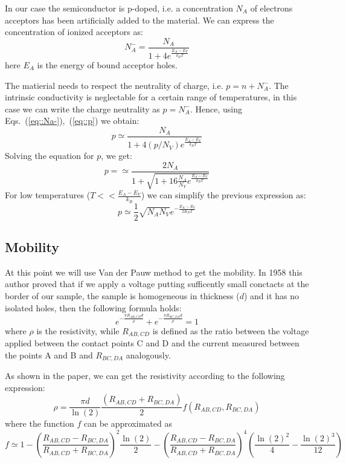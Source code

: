\documentclass[11pt,a4paper]{article}
\begin{document}
In our case the semiconductor is p-doped, i.e. a concentration $N_A$ of electrons acceptors has been artificially added to the material. We can express the concentration of ionized acceptors as:
\begin{equation}
N_A^-=\frac{N_A}{1+4e^{\frac{E_A-E_F}{k_BT}}}\label{eq::Na-}
\end{equation}
here $E_A$ is the energy of bound acceptor holes.

The matierial needs to respect the neutrality of charge, i.e. $p=n+N_A^-$. The intrinsic conductivity is neglectable for a certain range of temperatures, in this case we can write the charge neutrality as $p=N_A^-$. Hence, using Eqs.~(\ref{eq::Na-}),~(\ref{eq::p}) we obtain:
\begin{equation}
p\simeq\frac{N_A}{1+4(p/N_V)e^{\frac{E_A-E_V}{k_BT}}}
\end{equation}
Solving the equation for $p$, we get:
\begin{equation}
p=\simeq\frac{2N_A}{1+\sqrt{1+16\frac{N_A}{N_V}e^\frac{E_A-E_V}{k_BT}}}
\end{equation}For low temperatures ($T<<\frac{E_A-E_V}{k_B}$) we can simplify the previous expression as:
\begin{equation}
p\simeq \frac{1}{2}\sqrt{N_AN_V}e^{-\frac{E_A-E_V}{2K_BT}}
\end{equation}

\subsection{Mobility}
At this point we will use Van der Pauw method to get the mobility. In 1958 this author \cite{vdP} proved that if we apply a voltage putting sufficently small conctacts at the border of our sample, the sample is homogeneous in thickness ($d$) and it has no isolated holes, then the following formula holds:
\begin{equation}
e^{-\frac{\pi R_{AB,CD}d}{\rho}}+e^{-\frac{\pi R_{BC,DA}d}{\rho}}=1
\end{equation}
where $\rho$ is the resistivity, while $R_{AB,CD}$ is defined as the ratio between the voltage applied between the contact points C and D and the current measured between the points A and B and $R_{BC,DA}$ analogously.

As shown in the paper, we can get the resistivity according to the following expression:
\begin{equation}
\rho=\frac{\pi d}{\ln(2)}\frac{(R_{AB,CD}+R_{BC,DA})}{2}f\left(R_{AB,CD},R_{BC,DA}\right)
\end{equation}
where the function $f$ can be approximated as
\begin{equation}
f \simeq 1-\left(\frac{R_{AB,CD}-R_{BC,DA}}{R_{AB,CD}+R_{BC,DA}}\right)^2 \frac{\ln(2)}{2}-\left(\frac{R_{AB,CD}-R_{BC,DA}}{R_{AB,CD}+R_{BC,DA}}\right)^4\left(\frac{\ln(2)^2}{4}-\frac{\ln(2)^3}{12}\right)
\end{equation}
\end{document}
